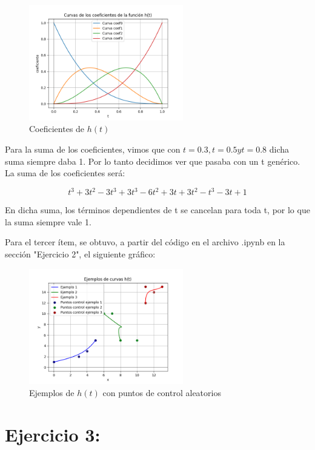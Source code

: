 \documentclass{article}
\begin{document}
\begin{figure}[H]
    \centering
    \includegraphics[width=0.6\textwidth]{imagenes/graf_2a.png}
    \caption{Coeficientes de $h(t)$}
    \label{fig:ejemplo}
\end{figure}

Para la suma de los coeficientes, vimos que con $t=0.3, t=0.5 y t=0.8$ dicha suma siempre daba 1. Por lo tanto decidimos ver que pasaba con un t genérico. La suma de los coeficientes será:

$$
t^3 + 3t^2-3t^3 + 3t^3-6t^2+3t +3t^2-t^3-3t+1
$$

En dicha suma, los términos dependientes de t se cancelan para toda t, por lo que la suma siempre vale 1.

Para el tercer ítem, se obtuvo, a partir del código en el archivo .ipynb en la sección "Ejercicio 2", el siguiente gráfico:

\begin{figure}[H]
    \centering
    \includegraphics[width=0.6\textwidth]{imagenes/graf_2c.png}
    \caption{Ejemplos de $h(t)$ con puntos de control aleatorios}
    \label{fig:ejemplo}
\end{figure}

\section*{Ejercicio 3:}
\end{document}

